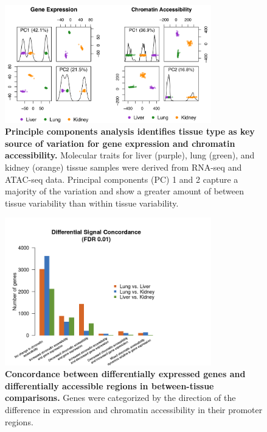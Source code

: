 \documentclass[10pt,letterpaper,twoside]{article}
\begin{document}
\clearpage 

\begin{figure}[hp]
\renewcommand{\familydefault}{\sfdefault}\normalfont
\centering
\includegraphics[width=0.8\textwidth, trim={0in 0in 0in 0in}, clip]{figs/pca_plot.png}
\caption{\textbf{Principle components analysis identifies tissue type as key source of variation for gene expression and chromatin accessibility.} 
Molecular traits for liver (purple), lung (green), and kidney (orange) tissue samples were derived from RNA-seq and ATAC-seq data. Principal components (PC) 1 and 2 capture a majority of the variation and show a greater amount of between tissue variability than within tissue variability. \label{fig:pca_plots}}
\end{figure}

\clearpage

\begin{figure}[hp]
\renewcommand{\familydefault}{\sfdefault}\normalfont
\centering
\includegraphics[width=0.8\textwidth, trim={0in 0in 0in 0in}, clip]{figs/diff_concordance.png}
\caption{\textbf{Concordance between differentially expressed genes and differentially accessible regions in between-tissue comparisons.} 
Genes were categorized by the direction of the difference in expression and chromatin accessibility in their promoter regions.\label{fig:diff_concordance}}
\end{figure}
\end{document}
